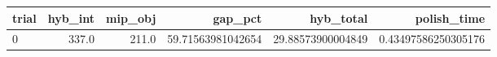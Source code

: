 \begin{tabular}{lrrrrr}
\hline
trial & hyb_int & mip_obj & gap_pct & hyb_total & polish_time \\ \hline
0 & 337.0 & 211.0 & 59.71563981042654 & 29.88573900004849 & 0.43497586250305176 \\
\hline
\end{tabular}
